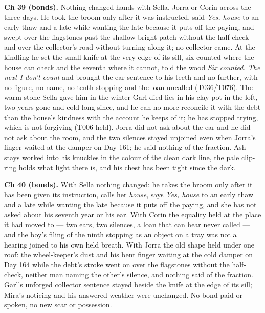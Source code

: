 \documentclass{design/chronicle}
\begin{document}
{\textbf{Ch 39 (bonds).} Nothing changed hands with Sella, Jorra or Corin across the three days. He took the broom only after it was instructed, said \emph{Yes, house} to an early thaw and a late while wanting the late because it puts off the paying, and swept over the flagstones past the shallow bright patch without the half-check and over the collector’s road without turning along it; no collector came. At the kindling he set the small knife at the very edge of its sill, six counted where the house can check and the seventh where it cannot, told the wood \emph{Six counted. The next I don’t count} and brought the ear-sentence to his teeth and no further, with no figure, no name, no tenth stopping and the loan uncalled (T036/T076). The warm stone Sella gave him in the winter Garl died lies in his clay pot in the loft, two years gone and cold long since, and he can no more reconcile it with the debt than the house’s kindness with the account he keeps of it; he has stopped trying, which is not forgiving (T006 held). Jorra did not ask about the ear and he did not ask about the room, and the two silences stayed unjoined even when Jorra’s finger waited at the damper on Day 161; he said nothing of the fraction. Ash stays worked into his knuckles in the colour of the clean dark line, the pale clip-ring holds what light there is, and his chest has been tight since the dark.

\textbf{Ch 40 (bonds).} With Sella nothing changed: he takes the broom only after it has been given its instruction, calls her \emph{house}, says \emph{Yes, house} to an early thaw and a late while wanting the late because it puts off the paying, and she has not asked about his seventh year or his ear. With Corin the equality held at the place it had moved to — two ears, two silences, a loan that can hear never called — and the boy’s filing of the ninth stopping as an object on a tray was not a hearing joined to his own held breath. With Jorra the old shape held under one roof: the wheel-keeper’s dust and his bent finger waiting at the cold damper on Day 164 while the debt’s stroke went on over the flagstones without the half-check, neither man naming the other’s silence, and nothing said of the fraction. Garl’s unforged collector sentence stayed beside the knife at the edge of its sill; Mira’s noticing and his answered weather were unchanged. No bond paid or spoken, no new scar or possession.

}
\end{document}
